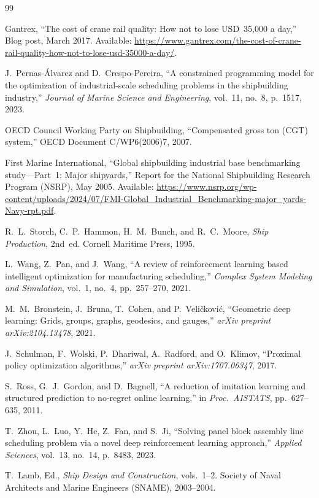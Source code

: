 \documentclass[12pt,letterpaper]{article}
\begin{document}
\begin{thebibliography}{99}


{Gantrex},
``The cost of crane rail quality: How not to lose {USD}~35,000 a day,''
Blog post, March 2017. Available: \url{https://www.gantrex.com/the-cost-of-crane-rail-quality-how-not-to-lose-usd-35000-a-day/}.

J.~Pernas-\'{A}lvarez and D.~Crespo-Pereira,
``A constrained programming model for the optimization of industrial-scale scheduling problems in the shipbuilding industry,''
\textit{Journal of Marine Science and Engineering}, vol.~11, no.~8, p.~1517, 2023.

{OECD Council Working Party on Shipbuilding},
``Compensated gross ton ({CGT}) system,''
OECD Document C/WP6(2006)7, 2007.

{First Marine International},
``Global shipbuilding industrial base benchmarking study---Part~1: Major shipyards,''
Report for the National Shipbuilding Research Program ({NSRP}), May 2005. Available: \url{https://www.nsrp.org/wp-content/uploads/2024/07/FMI-Global_Industrial_Benchmarking-major_yards-Navy-rpt.pdf}.

R.~L.~Storch, C.~P.~Hammon, H.~M.~Bunch, and R.~C.~Moore,
\textit{Ship Production}, 2nd~ed.
Cornell Maritime Press, 1995.

L.~Wang, Z.~Pan, and J.~Wang,
``A review of reinforcement learning based intelligent optimization for manufacturing scheduling,''
\textit{Complex System Modeling and Simulation}, vol.~1, no.~4, pp.~257--270, 2021.

M.~M.~Bronstein, J.~Bruna, T.~Cohen, and P.~Veli\v{c}kovi\'{c},
``Geometric deep learning: Grids, groups, graphs, geodesics, and gauges,''
\textit{arXiv preprint arXiv:2104.13478}, 2021.


J.~Schulman, F.~Wolski, P.~Dhariwal, A.~Radford, and O.~Klimov,
``Proximal policy optimization algorithms,''
\textit{arXiv preprint arXiv:1707.06347}, 2017.

S.~Ross, G.~J.~Gordon, and D.~Bagnell,
``A reduction of imitation learning and structured prediction to no-regret online learning,''
in \textit{Proc.\ AISTATS}, pp.~627--635, 2011.

T.~Zhou, L.~Luo, Y.~He, Z.~Fan, and S.~Ji,
``Solving panel block assembly line scheduling problem via a novel deep reinforcement learning approach,''
\textit{Applied Sciences}, vol.~13, no.~14, p.~8483, 2023.

T.~Lamb, Ed.,
\textit{Ship Design and Construction}, vols.~1--2.
Society of Naval Architects and Marine Engineers ({SNAME}), 2003--2004.

\end{thebibliography}
\end{document}
